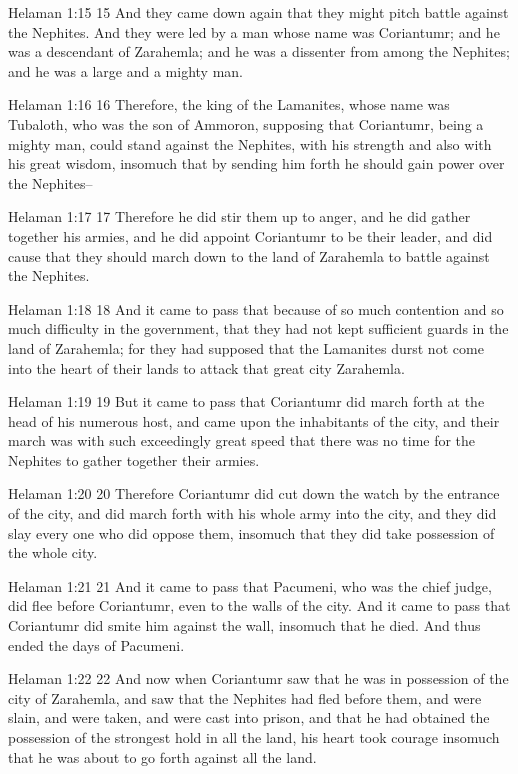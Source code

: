 Helaman 1:15
 15 And they came down again that they might pitch battle against
the Nephites. And they were led by a man whose name was
Coriantumr; and he was a descendant of Zarahemla; and he was a
dissenter from among the Nephites; and he was a large and a
mighty man.

Helaman 1:16
 16 Therefore, the king of the Lamanites, whose name was
Tubaloth, who was the son of Ammoron, supposing that Coriantumr,
being a mighty man, could stand against the Nephites, with his
strength and also with his great wisdom, insomuch that by sending
him forth he should gain power over the Nephites--

Helaman 1:17
 17 Therefore he did stir them up to anger, and he did gather
together his armies, and he did appoint Coriantumr to be their
leader, and did cause that they should march down to the land of
Zarahemla to battle against the Nephites.

Helaman 1:18
 18 And it came to pass that because of so much contention and so
much difficulty in the government, that they had not kept
sufficient guards in the land of Zarahemla; for they had supposed
that the Lamanites durst not come into the heart of their lands
to attack that great city Zarahemla.

Helaman 1:19
 19 But it came to pass that Coriantumr did march forth at the
head of his numerous host, and came upon the inhabitants of the
city, and their march was with such exceedingly great speed that
there was no time for the Nephites to gather together their
armies.

Helaman 1:20
 20 Therefore Coriantumr did cut down the watch by the entrance
of the city, and did march forth with his whole army into the
city, and they did slay every one who did oppose them, insomuch
that they did take possession of the whole city.

Helaman 1:21
 21 And it came to pass that Pacumeni, who was the chief judge,
did flee before Coriantumr, even to the walls of the city. And
it came to pass that Coriantumr did smite him against the wall,
insomuch that he died. And thus ended the days of Pacumeni.

Helaman 1:22
 22 And now when Coriantumr saw that he was in possession of the
city of Zarahemla, and saw that the Nephites had fled before
them, and were slain, and were taken, and were cast into prison,
and that he had obtained the possession of the strongest hold in
all the land, his heart took courage insomuch that he was about
to go forth against all the land.

